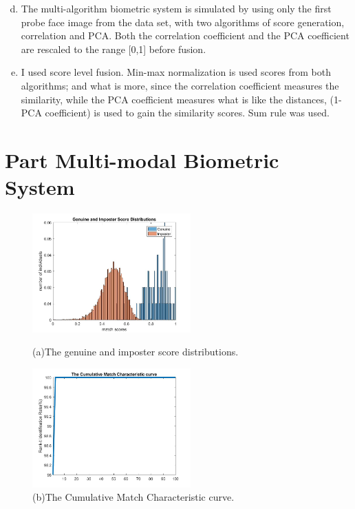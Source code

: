 \documentclass[a4paper]{article}
\begin{document}
\begin{spacing}{2.0}
	\begin{enumerate}[(a)]
	\setcounter{enumi}{3}
	\item The multi-algorithm biometric system is simulated by using only the first probe face image from the data set, with two algorithms of score generation, correlation and PCA. Both the correlation coefficient and the PCA coefficient are rescaled to the range [0,1] before fusion.
	\item I used score level fusion. Min-max normalization is used scores from both algorithms; and what is more, since the correlation coefficient measures the similarity, while the PCA coefficient measures what is like the distances, (1-PCA coefficient) is used to gain the similarity scores. Sum rule was used.
	\end{enumerate}

\section*{\huge\textbf{ Part \uppercase\expandafter{} Multi-modal Biometric System}  }
	\normalsize
	\begin{figure}[H]
	\begin{minipage}[t]{0.3\linewidth}
	\centering
	\includegraphics[width=2.4in]{Part3Dis.jpg}
	\caption{(a)The genuine and imposter score distributions.}
	\label{scoDis3}
	\end{minipage}
	\begin{minipage}[t]{0.3\linewidth}
	\centering
	\includegraphics[width=2.4in]{Part3CMC.jpg}
	\caption{(b)The Cumulative Match Characteristic curve.}
	\label{CMC3}

\end{minipage}
\end{figure}
\end{spacing}
\end{document}
